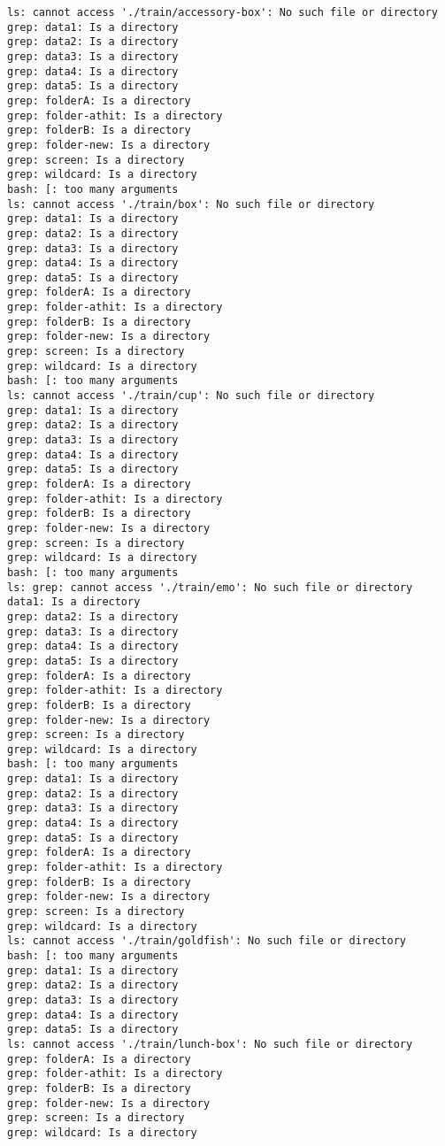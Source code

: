 \documentclass[11pt]{article}
\begin{document}
    \begin{Verbatim}[commandchars=\\\{\}]
ls: cannot access './train/accessory-box': No such file or directory
grep: data1: Is a directory
grep: data2: Is a directory
grep: data3: Is a directory
grep: data4: Is a directory
grep: data5: Is a directory
grep: folderA: Is a directory
grep: folder-athit: Is a directory
grep: folderB: Is a directory
grep: folder-new: Is a directory
grep: screen: Is a directory
grep: wildcard: Is a directory
bash: [: too many arguments
ls: cannot access './train/box': No such file or directory
grep: data1: Is a directory
grep: data2: Is a directory
grep: data3: Is a directory
grep: data4: Is a directory
grep: data5: Is a directory
grep: folderA: Is a directory
grep: folder-athit: Is a directory
grep: folderB: Is a directory
grep: folder-new: Is a directory
grep: screen: Is a directory
grep: wildcard: Is a directory
bash: [: too many arguments
ls: cannot access './train/cup': No such file or directory
grep: data1: Is a directory
grep: data2: Is a directory
grep: data3: Is a directory
grep: data4: Is a directory
grep: data5: Is a directory
grep: folderA: Is a directory
grep: folder-athit: Is a directory
grep: folderB: Is a directory
grep: folder-new: Is a directory
grep: screen: Is a directory
grep: wildcard: Is a directory
bash: [: too many arguments
ls: grep: cannot access './train/emo': No such file or directory
data1: Is a directory
grep: data2: Is a directory
grep: data3: Is a directory
grep: data4: Is a directory
grep: data5: Is a directory
grep: folderA: Is a directory
grep: folder-athit: Is a directory
grep: folderB: Is a directory
grep: folder-new: Is a directory
grep: screen: Is a directory
grep: wildcard: Is a directory
bash: [: too many arguments
grep: data1: Is a directory
grep: data2: Is a directory
grep: data3: Is a directory
grep: data4: Is a directory
grep: data5: Is a directory
grep: folderA: Is a directory
grep: folder-athit: Is a directory
grep: folderB: Is a directory
grep: folder-new: Is a directory
grep: screen: Is a directory
grep: wildcard: Is a directory
ls: cannot access './train/goldfish': No such file or directory
bash: [: too many arguments
grep: data1: Is a directory
grep: data2: Is a directory
grep: data3: Is a directory
grep: data4: Is a directory
grep: data5: Is a directory
ls: cannot access './train/lunch-box': No such file or directory
grep: folderA: Is a directory
grep: folder-athit: Is a directory
grep: folderB: Is a directory
grep: folder-new: Is a directory
grep: screen: Is a directory
grep: wildcard: Is a directory

\end{Verbatim}
\end{document}
